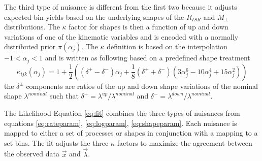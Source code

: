 The third type of nuisance is different from the first two because it adjusts expected bin yields based on the underlying shapes of the $R_{ISR}$ and $M_\perp$ distributions. The $\kappa$ factor for shapes is then a function of up and down variations of one of the kinematic variables and is encoded with a normally distributed prior $\pi(\alpha_j)$. The $\kappa$ definition is based on the interpolation $-1<\alpha_j<1$ and is written as following based on a predefined shape treatment \cite{Conway:2011in}
\begin{equation}
\label{eq:shapeparam}
\kappa_{ijk}(\alpha_j)= 1 + \frac{1}{2}((\delta^+ - \delta^-)\alpha_j + \frac{1}{8}(\delta^+ + \delta^-)(3\alpha_j^6-10\alpha_j^4+15\alpha_j^2))
\end{equation}
the $\delta^\pm$ components are ratios of the up and down shape variations of the nominal shape $\lambda^{nominal}$ such that $\delta^+ = \lambda^{up}/\lambda^{nominal}$ and $\delta^- = \lambda^{down}/\lambda^{nominal}.$

The Likelihood Equation \ref{eq:fit} combines the three types of nuisances from equations \ref{eq:rateparam}, \ref{eq:logparam}, \ref{eq:shapeparam}. Each nuisance is mapped to either a set of processes or shapes in conjunction with a mapping to a set bins. The fit adjusts the three $\kappa$ factors to maximize the agreement between the observed data $\vec{x}$ and $\vec{\lambda}$. 


